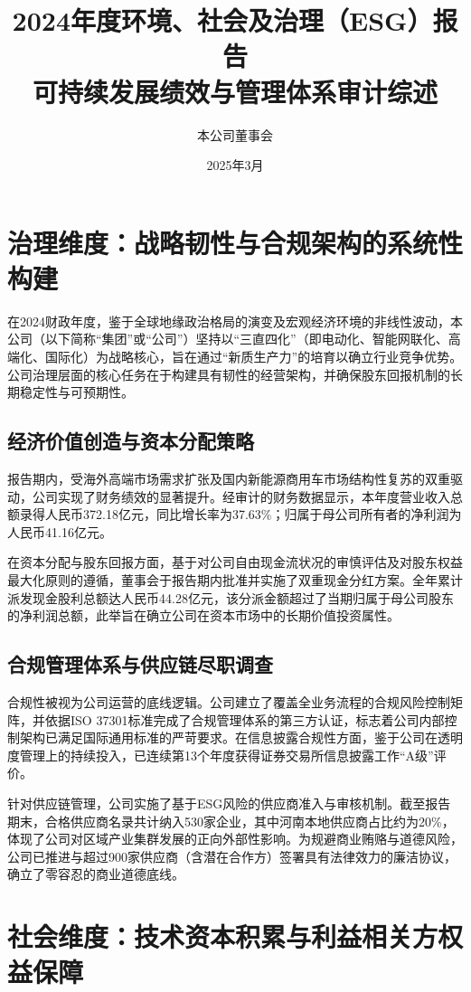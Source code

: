 \documentclass[a4paper,12pt]{article}
\title{\textbf{2024年度环境、社会及治理（ESG）报告}\\ \large 可持续发展绩效与管理体系审计综述}
\author{本公司董事会}
\date{2025年3月}
\begin{document}
\maketitle

\section{治理维度：战略韧性与合规架构的系统性构建}

在2024财政年度，鉴于全球地缘政治格局的演变及宏观经济环境的非线性波动，本公司（以下简称“集团”或“公司”）坚持以“三直四化”（即电动化、智能网联化、高端化、国际化）为战略核心，旨在通过“新质生产力”的培育以确立行业竞争优势。公司治理层面的核心任务在于构建具有韧性的经营架构，并确保股东回报机制的长期稳定性与可预期性。

\subsection{经济价值创造与资本分配策略}
报告期内，受海外高端市场需求扩张及国内新能源商用车市场结构性复苏的双重驱动，公司实现了财务绩效的显著提升。经审计的财务数据显示，本年度营业收入总额录得人民币372.18亿元，同比增长率为37.63\%；归属于母公司所有者的净利润为人民币41.16亿元。

在资本分配与股东回报方面，基于对公司自由现金流状况的审慎评估及对股东权益最大化原则的遵循，董事会于报告期内批准并实施了双重现金分红方案。全年累计派发现金股利总额达人民币44.28亿元，该分派金额超过了当期归属于母公司股东的净利润总额，此举旨在确立公司在资本市场中的长期价值投资属性。

\subsection{合规管理体系与供应链尽职调查}
合规性被视为公司运营的底线逻辑。公司建立了覆盖全业务流程的合规风险控制矩阵，并依据ISO 37301标准完成了合规管理体系的第三方认证，标志着公司内部控制架构已满足国际通用标准的严苛要求。在信息披露合规性方面，鉴于公司在透明度管理上的持续投入，已连续第13个年度获得证券交易所信息披露工作“A级”评价。

针对供应链管理，公司实施了基于ESG风险的供应商准入与审核机制。截至报告期末，合格供应商名录共计纳入530家企业，其中河南本地供应商占比约为20\%，体现了公司对区域产业集群发展的正向外部性影响。为规避商业贿赂与道德风险，公司已推进与超过900家供应商（含潜在合作方）签署具有法律效力的廉洁协议，确立了零容忍的商业道德底线。

\section{社会维度：技术资本积累与利益相关方权益保障}
\end{document}
